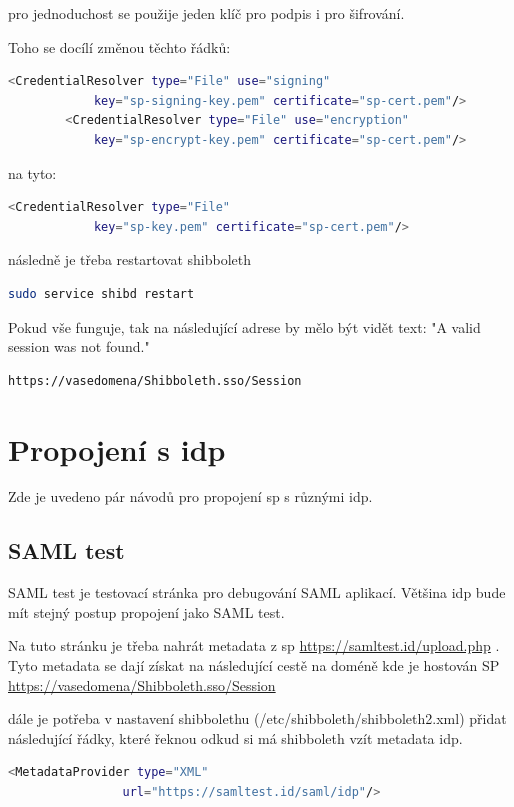 pro jednoduchost se použije jeden klíč pro podpis i pro šifrování.

Toho se docílí změnou těchto řádků:
\begin{lstlisting}[language=Bash]
<CredentialResolver type="File" use="signing"
            key="sp-signing-key.pem" certificate="sp-cert.pem"/>
        <CredentialResolver type="File" use="encryption"
            key="sp-encrypt-key.pem" certificate="sp-cert.pem"/>
\end{lstlisting}

na tyto:
\begin{lstlisting}[language=Bash]
<CredentialResolver type="File"
            key="sp-key.pem" certificate="sp-cert.pem"/>
\end{lstlisting}

následně je třeba restartovat shibboleth
\begin{lstlisting}[language=Bash]
sudo service shibd restart
\end{lstlisting}

Pokud vše funguje, tak na následující adrese by mělo být vidět text: "A valid session was not found."
\begin{lstlisting}[language=Bash]
https://vasedomena/Shibboleth.sso/Session
\end{lstlisting}

\section{Propojení s idp}

Zde je uvedeno pár návodů pro propojení sp s různými idp.

\subsection{SAML test}
SAML test je testovací stránka pro debugování SAML aplikací. Většina idp bude mít stejný postup propojení jako SAML test.



Na tuto stránku je třeba nahrát metadata z sp 
\url{https://samltest.id/upload.php}  . Tyto metadata se dají získat na následující cestě na doméně kde je hostován SP \url{https://vasedomena/Shibboleth.sso/Session }

dále je potřeba v nastavení shibbolethu (/etc/shibboleth/shibboleth2.xml) přidat následující řádky, které řeknou odkud si má shibboleth vzít metadata idp.
\begin{lstlisting}[language=Bash]
 <MetadataProvider type="XML"
                url="https://samltest.id/saml/idp"/>
\end{lstlisting}

